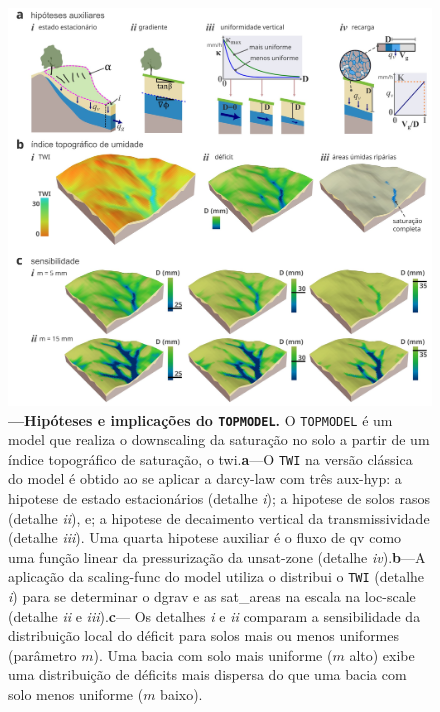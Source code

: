 \documentclass[./main.tex]{subfiles}
\begin{document}
\begin{figure}[t!] 
\centering				
\includegraphics[width=0.98\linewidth]{figs/fig_topmodel.jpg}		
\caption[Hipóteses e implicações do \texttt{TOPMODEL}]
{\textbf{---\;Hipóteses e implicações do \texttt{TOPMODEL}.}
    O \texttt{TOPMODEL} é um \gls{model} que realiza o \gls{downscaling} da saturação no solo a partir de um índice topográfico de saturação, o \gls{twi}.\;\textbf{a}\;---\;O \texttt{TWI} na versão clássica do \gls{model} é obtido ao se aplicar a \gls{darcy-law} com três \gls{aux-hyp}: a \gls{hipotese} de estado estacionários (detalhe \textrm{\textit{i}}); a \gls{hipotese} de solos rasos (detalhe \textrm{\textit{ii}}), e; a \gls{hipotese} de decaimento vertical da transmissividade (detalhe \textrm{\textit{iii}}). Uma quarta \gls{hipotese} auxiliar é o fluxo de \gls{qv} como uma função linear da pressurização da \gls{unsat-zone} (detalhe \textrm{\textit{iv}}).\;\textbf{b}\;---\;A aplicação da \gls{scaling-func} do \gls{model} utiliza o distribui o \texttt{TWI} (detalhe \textrm{\textit{i}}) para se determinar o \gls{dgrav} e as \gls{sat_areas} na escala na \gls{loc-scale} (detalhe \textrm{\textit{ii}} e \textrm{\textit{iii}}).\;\textbf{c}\;---\; Os detalhes \textrm{\textit{i}} e \textrm{\textit{ii}} comparam a sensibilidade da distribuição local do déficit para solos mais ou menos uniformes (parâmetro $m$). Uma bacia com solo mais uniforme ($m$ alto) exibe uma distribuição de déficits mais dispersa do que uma bacia com solo menos uniforme ($m$ baixo). 
}
\label{fig:hydro:topmodel} 		
\end{figure}
\end{document}
